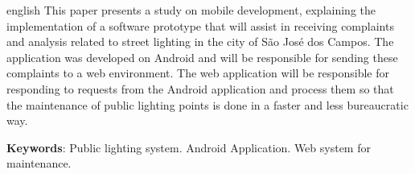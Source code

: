 \documentclass[
	article,			%
	11pt,				%
	oneside,			%
	a4paper,			%
	english,			%
	brazil,				%
	sumario=tradicional
	]{abntex2}
\begin{document}
\emptythanks
\maketitle
\renewcommand{\resumoname}{Abstract}
\begin{resumoumacoluna}
 \begin{otherlanguage*}{english}
   This paper presents a study on mobile development, explaining the
   implementation of a software prototype that will assist in receiving
   complaints and analysis related to street lighting in the city of São José
   dos Campos. The application was developed on Android and will be responsible
   for sending these complaints to a web environment. The web application
   will be responsible for responding to requests from the Android application
   and process them so that the maintenance of public lighting points is done
   in a faster and less bureaucratic way.
   \vspace{\onelineskip}

   \noindent
   \textbf{Keywords}: Public lighting system. Android Application. Web system for maintenance.
 \end{otherlanguage*}
\end{resumoumacoluna}



\end{document}

